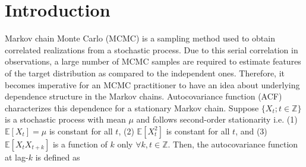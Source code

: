 \documentclass[11pt]{article}
\theoremstyle{remark}
\begin{document}







\section{Introduction} \label{sec:intro}

Markov chain Monte Carlo (MCMC) is a sampling method used to obtain correlated realizations from a stochastic process. Due to this serial correlation in observations, a large number of MCMC samples are required to estimate features of the target distribution as compared to the independent ones. Therefore, it becomes imperative for an MCMC practitioner to have an idea about underlying dependence structure in the Markov chains. Autocovariance function (ACF) characterizes this dependence for a stationary Markov chain. Suppose $\{X_t; t \in \mathbb{Z}\}$ is a stochastic process with mean $\mu$ and follows second-order stationarity i.e. (1) $\mathbb{E}[X_t] = \mu$ is constant for all $t$, (2) $\mathbb{E}[X_t^2]$ is constant for all $t$, and (3) $\mathbb{E}[X_t X_{t+k}]$ is a function of $k$ only $\forall k,t \in \mathbb{Z}$. Then, the autocovariance function at lag-$k$ is defined as
\end{document}
